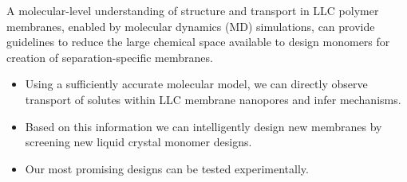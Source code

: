\documentclass{article}
\begin{document}
  A molecular-level understanding of structure and transport in LLC polymer 
  membranes, enabled by molecular dynamics (MD) simulations, can provide 
  guidelines to reduce the large chemical space available to design
  monomers for creation of separation-specific membranes. 
  \begin{itemize}
    \item Using a sufficiently accurate molecular model, we can directly 
    observe transport of solutes within LLC membrane nanopores and infer
    mechanisms. 
    \item Based on this information we can intelligently design new membranes
    by screening new liquid crystal monomer designs.
    \item Our most promising designs can be tested experimentally.
  \end{itemize}
  
\end{document}

